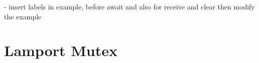 \documentclass{thesul}
\begin{document}
\begin{appendices}
- insert labels in example, before await and also for receive and clear then modify the example


\section{Lamport Mutex}

\end{appendices}



\end{document}
